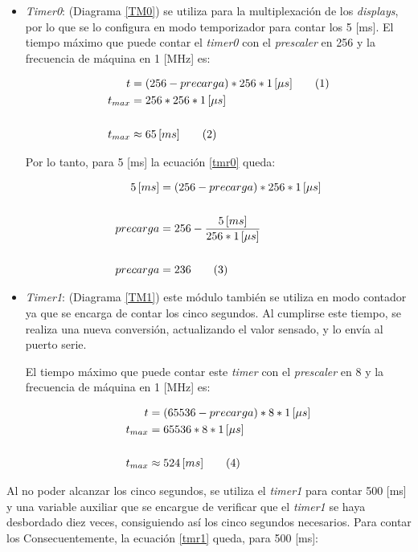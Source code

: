 \documentclass[12pt,a4paper]{article}
\newcommand\numberthis{\addtocounter{equation}{1}\tag{\theequation}}
\begin{document}
	\begin{itemize}
	\item \emph{Timer0}: (Diagrama \ref{TM0}) se utiliza para la multiplexación de los \emph{displays}, por lo que se lo configura en modo temporizador para contar los 5 [ms]. El tiempo máximo que puede contar el \emph{timer0} con el \emph{prescaler} en 256 y la frecuencia de máquina en 1 [MHz] es:
	
	\begin{align*}
	\label{tmr0}
	t &= (256 - precarga) * 256 * 1\,[\mu s] \numberthis \\
	t_{max} &= 256 * 256 * 1\,[\mu s]\\
	\\t_{max} &\approx 65\,[ms] \numberthis
	\end{align*}
	
	\newpage
	Por lo tanto, para 5 [ms] la ecuación \ref{tmr0} queda:
	
	\begin{align*}
	5\,[ms] &= (256 - precarga) * 256 * 1\,[\mu s]\\
	\\ precarga &= 256 - \frac{5\,[ms]}{256 * 1\,[\mu s]}\\
	\\ precarga &= 236 \numberthis
	\end{align*}
	
	\item \emph{Timer1}: (Diagrama \ref{TM1}) este módulo también se utiliza en modo contador ya que se encarga de contar los cinco segundos. Al cumplirse este tiempo, se realiza una nueva conversión, actualizando el valor sensado, y lo envía al puerto serie.
	
	El tiempo máximo que puede contar este \emph{timer} con el \emph{prescaler} en 8 y la frecuencia de máquina en 1 [MHz] es:
	
	\begin{align*}
	\label{tmr1}
	t &= (65536 - precarga) * 8 * 1\,[\mu s]\\
	t_{max} &= 65536 * 8 * 1\,[\mu s]\\
	\\t_{max} &\approx 524\,[ms] \numberthis
	\end{align*}
	\end{itemize}
	
	Al no poder alcanzar los cinco segundos, se utiliza el \emph{timer1} para contar 500 [ms] y una variable auxiliar que se encargue de verificar que el \emph{timer1} se haya desbordado diez veces, consiguiendo así los cinco segundos necesarios. Para contar los 
	Consecuentemente, la ecuación \ref{tmr1} queda, para 500 [ms]:
	
\end{document}
